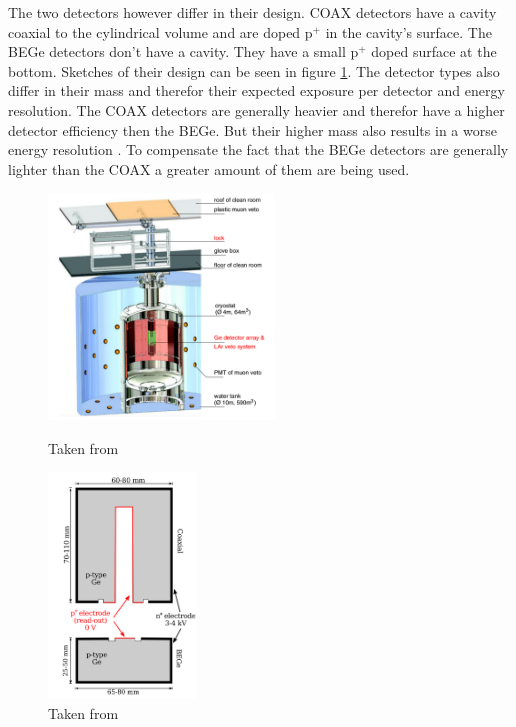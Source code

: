 \documentclass[encoding=utf8,british]{tumphthesis}
\begin{document}
The two detectors however differ in their design.
COAX detectors have a cavity coaxial to the cylindrical volume and are doped p$^+$ in the cavity's surface.
The BEGe detectors don't have a cavity.
They have a small p$^+$ doped surface at the bottom.
Sketches of their design can be seen in figure \ref{fig:DetcDes}.
The detector types also differ in their mass and therefor their expected exposure per detector and energy resolution.
The COAX detectors are generally heavier and therefor have a higher detector efficiency then the BEGe.
But their higher mass also results in a worse energy resolution \cite{agostini_production_2015}.
To compensate the fact that the BEGe detectors are generally lighter than the COAX a greater amount of them are being used.
\\

\begin{figure}[t!]
	\centering
	\begin{minipage}{.5\textwidth}
		\centering
		\includegraphics[height=60mm]{./Bilder/GERDAsetupPhaseII.png}
		\caption{Taken from \cite{collaboration_upgrade_2018}}
		\label{fig:GERDASetupPII}
	\end{minipage}%
	\begin{minipage}{.5\textwidth}
		\centering
		\includegraphics[height=60mm]{./Bilder/DetectorDesign.png}
		\caption{Taken from \cite{agostini_background_2014}}
		\label{fig:DetcDes}
	\end{minipage}
\end{figure}
\end{document}
